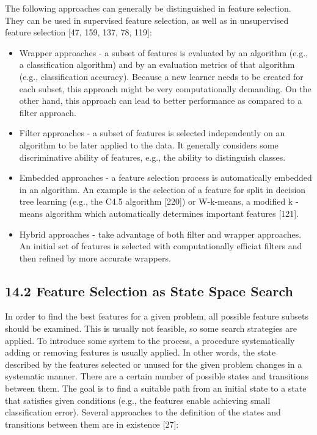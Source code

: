 \documentclass[10pt]{book}
\begin{document}
The following approaches can generally be distinguished in feature selection. They can be used in supervised feature selection, as well as in unsupervised feature selection [47, 159, 137, 78, 119]:

\begin{itemize}
  \item Wrapper approaches - a subset of features is evaluated by an algorithm (e.g., a classification algorithm) and by an evaluation metrics of that algorithm (e.g., classification accuracy). Because a new learner needs to be created for each subset, this approach might be very computationally demanding. On the other hand, this approach can lead to better performance as compared to a filter approach.
  \item Filter approaches - a subset of features is selected independently on an algorithm to be later applied to the data. It generally considers some discriminative ability of features, e.g., the ability to distinguish classes.
  \item Embedded approaches - a feature selection process is automatically embedded in an algorithm. An example is the selection of a feature for split in decision tree learning (e.g., the C4.5 algorithm [220]) or W-k-means, a modified k -means algorithm which automatically determines important features [121].
  \item Hybrid approaches - take advantage of both filter and wrapper approaches. An initial set of features is selected with computationally efficiat filters and then refined by more accurate wrappers.
\end{itemize}

\subsection*{14.2 Feature Selection as State Space Search}
In order to find the best features for a given problem, all possible feature subsets should be examined. This is usually not feasible, so some search strategies are applied. To introduce some system to the process, a procedure systematically adding or removing features is usually applied. In other words, the state described by the features selected or unused for the given problem changes in a systematic manner. There are a certain number of possible states and transitions between them. The goal is to find a suitable path from an initial state to a state that satisfies given conditions (e.g., the features enable achieving small classification error). Several approaches to the definition of the states and transitions between them are in existence [27]:
\end{document}
